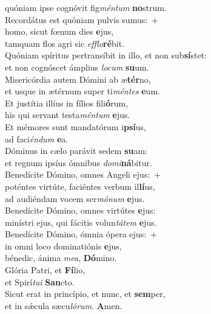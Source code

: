 \oddverse quóniam ipse cognóvit fig\textit{mén}\textit{tum} \textbf{no}strum.\\
\evenverse Recordátus est quóniam pulvis sumus:~+\\
\evenverse  homo, sicut fœnum dies \textbf{e}jus,~\*\\
\evenverse tamquam flos agri sic \textit{ef}\textit{flo}\textbf{ré}bit.\\
\oddverse Quóniam spíritus pertransíbit in illo, et non sub\textbf{sí}stet:~\*\\
\oddverse et non cognóscet ámplius \textit{lo}\textit{cum} \textbf{su}um.\\
\evenverse Misericórdia autem Dómini ab æ\textbf{tér}no,~\*\\
\evenverse et usque in ætérnum super ti\textit{mén}\textit{tes} \textbf{e}um.\\
\oddverse Et justítia illíus in fílios fili\textbf{ó}rum,~\*\\
\oddverse his qui servant testa\textit{mén}\textit{tum} \textbf{e}jus.\\
\evenverse Et mémores sunt mandatórum i\textbf{psí}us,~\*\\
\evenverse ad faci\textit{én}\textit{dum} \textbf{e}a.\\
\oddverse Dóminus in cælo parávit sedem \textbf{su}am:~\*\\
\oddverse et regnum ipsíus ómnibus \textit{do}\textit{mi}\textbf{ná}bitur.\\
\evenverse Benedícite Dómino, omnes Angeli ejus:~+\\
\evenverse  poténtes virtúte, faciéntes verbum il\textbf{lí}us,~\*\\
\evenverse ad audiéndam vocem ser\textit{mó}\textit{num} \textbf{e}jus.\\
\oddverse Benedícite Dómino, omnes virtútes \textbf{e}jus:~\*\\
\oddverse minístri ejus, qui fácitis volun\textit{tá}\textit{tem} \textbf{e}jus.\\
\evenverse Benedícite Dómino, ómnia ópera ejus:~+\\
\evenverse  in omni loco dominatiónis \textbf{e}jus,~\*\\
\evenverse bénedic, ánima \textit{me}\textit{a}, \textbf{Dó}mino.\\
\oddverse Glória Patri, et \textbf{Fí}lio,~\*\\
\oddverse et Spirí\textit{tu}\textit{i} \textbf{San}cto.\\
\evenverse Sicut erat in princípio, et nunc, et \textbf{sem}per,~\*\\
\evenverse et in sǽcula sæcu\textit{ló}\textit{rum}. \textbf{A}men.\\

